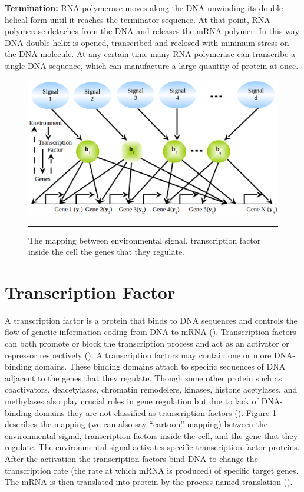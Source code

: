 \textbf{Termination:} RNA polymerase moves along the DNA unwinding its double helical form until it 
reaches the terminator sequence. At that point, RNA polymerase detaches from the DNA and 
releases the mRNA polymer. In this way DNA double helix is opened, transcribed and reclosed 
with minimum stress on the DNA molecule. At any certain time many RNA polymerase can transcribe 
a single DNA sequence, which can manufacture a large quantity of protein at once. 

\begin{figure}[]
	\centering
		\includegraphics[width=\textwidth,keepaspectratio]{diagrams/MappingEnvironmentalSignal.eps}
		\rule{35em}{0.5pt}
	\caption[The mapping between environmental signal, transcription factor 
	inside the cell the genes that they regulate]{The mapping between environmental signal, transcription factor 
	inside the cell the genes that they regulate.}
	\label{fig:MappingEnvironmentalSignal}
\end{figure}

\section{Transcription Factor}
A transcription factor is a protein that binds to DNA sequences and controls the flow of genetic 
information coding from DNA to mRNA (\cite{karin:1990, Latchman:1997}). Transcription 
factors can both promote or block the transcription process and act as an activator 
or repressor respectively (\cite{Lee:2000, Nikolov:1997, Roeder:1996}). 
A transcription factors may contain one or more DNA-binding domains. These binding domains 
attach to specific sequences of DNA adjacent to the genes that they regulate. Though 
some other protein such as coactivators, deacetylases, chromatin remodelers, kinases, histone 
acetylases, and methylases also play crucial roles in gene regulation but due to lack 
of DNA-binding domains they are not classified as transcription factors 
(\cite{Mitchell:1989, Ptashne:1997, Brivanlou:2002}). 
Figure \ref{fig:MappingEnvironmentalSignal} describes the mapping (we can also say ``cartoon'' mapping) 
between the environmental signal, transcription factors 
inside the cell, and the gene that they regulate. The environmental signal activates 
specific transcription factor proteins. After the activation the transcription factors 
bind DNA to change the transcription rate (the rate at which mRNA is produced) of 
specific target genes. The mRNA is then translated into protein by the process named translation
(\cite{Alon:2006}). 

